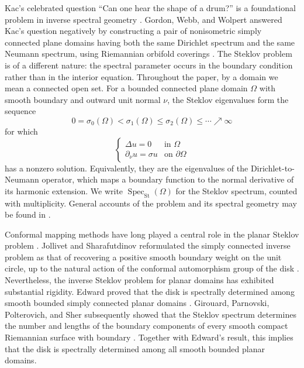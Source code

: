 \documentclass[11pt,letterpaper,reqno]{amsart}
\theoremstyle{definition}
\newcommand{\SpecS}{\operatorname{Spec}_{\mathrm{St}}}
\begin{document}
Kac's celebrated question ``Can one hear the shape of a drum?'' is a
foundational problem in inverse spectral geometry \cite{Kac1966}. Gordon, Webb, and Wolpert answered Kac's question negatively by
constructing a pair of nonisometric simply connected plane domains
having both the same Dirichlet spectrum and the same Neumann spectrum,
using Riemannian orbifold coverings
\cite{GordonWebbWolpert1992}. The Steklov problem is of a different
nature: the spectral parameter occurs in the boundary condition rather
than in the interior equation. Throughout the paper, by a domain we mean a connected open set. For a bounded connected plane domain
$\Omega$ with smooth boundary and outward unit normal $\nu$, the
Steklov eigenvalues form the sequence
\[
0=\sigma_0(\Omega)<\sigma_1(\Omega)\leq \sigma_2(\Omega)
\leq\cdots\nearrow\infty
\]
for which
\[
\begin{cases}
\Delta u = 0 & \text{in } \Omega \\ \partial_\nu u = \sigma u & \text{on } \partial\Omega
\end{cases}
\]
has a nonzero solution. Equivalently, they are the eigenvalues of the Dirichlet-to-Neumann
operator, which maps a boundary function to the normal derivative of
its harmonic extension. We write $\SpecS(\Omega)$ for the Steklov
spectrum, counted with multiplicity. General accounts of the problem and its spectral
geometry may be found in
\cite{ColboisGirouardGordonSher2024,GirouardPolterovich2017}.







Conformal mapping methods have long played a central role in the
planar Steklov problem \cite{Dittmar1988}.  Jollivet and Sharafutdinov reformulated the simply connected inverse problem as that of recovering a positive smooth boundary weight on the unit circle, up to the natural action of the conformal automorphism group of the disk \cite{JollivetSharafutdinov2014}.  Nevertheless, the
inverse Steklov problem for planar domains has exhibited substantial
rigidity.  Edward proved that the disk is spectrally determined among smooth bounded simply connected planar domains \cite{Edward1993}. Girouard, Parnovski, Polterovich, and Sher subsequently showed that the Steklov spectrum determines the number and lengths of the boundary components of every smooth compact Riemannian surface with boundary \cite{GirouardParnovskiPolterovichSher2014}. Together with Edward's result, this implies that the disk is spectrally determined among all smooth bounded planar domains.
\end{document}
